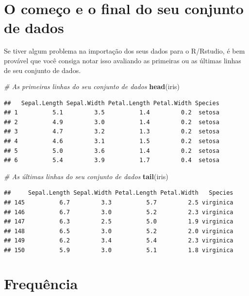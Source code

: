 \documentclass[
]{book}
\newenvironment{Shaded}{\begin{snugshade}}{\end{snugshade}}
\newcommand{\CommentTok}[1]{\textcolor[rgb]{0.56,0.35,0.01}{\textit{#1}}}
\newcommand{\KeywordTok}[1]{\textcolor[rgb]{0.13,0.29,0.53}{\textbf{#1}}}
\newcommand{\NormalTok}[1]{#1}
\begin{document}
\hypertarget{o-comeuxe7o-e-o-final-do-seu-conjunto-de-dados}{%
\section{O começo e o final do seu conjunto de
dados}\label{o-comeuxe7o-e-o-final-do-seu-conjunto-de-dados}}

Se tiver algum problema na importação dos seus dados para o R/Rstudio, é
bem provável que você consiga notar isso avaliando as primeiras ou as
últimas linhas de seu conjunto de dados.

\begin{Shaded}
\begin{Highlighting}[]
\CommentTok{# As primeiras linhas do seu conjunto de dados}
\KeywordTok{head}\NormalTok{(iris)}
\end{Highlighting}
\end{Shaded}

\begin{verbatim}
##   Sepal.Length Sepal.Width Petal.Length Petal.Width Species
## 1          5.1         3.5          1.4         0.2  setosa
## 2          4.9         3.0          1.4         0.2  setosa
## 3          4.7         3.2          1.3         0.2  setosa
## 4          4.6         3.1          1.5         0.2  setosa
## 5          5.0         3.6          1.4         0.2  setosa
## 6          5.4         3.9          1.7         0.4  setosa
\end{verbatim}

\begin{Shaded}
\begin{Highlighting}[]
\CommentTok{# As últimas linhas do seu conjunto de dados}
\KeywordTok{tail}\NormalTok{(iris)}
\end{Highlighting}
\end{Shaded}

\begin{verbatim}
##     Sepal.Length Sepal.Width Petal.Length Petal.Width   Species
## 145          6.7         3.3          5.7         2.5 virginica
## 146          6.7         3.0          5.2         2.3 virginica
## 147          6.3         2.5          5.0         1.9 virginica
## 148          6.5         3.0          5.2         2.0 virginica
## 149          6.2         3.4          5.4         2.3 virginica
## 150          5.9         3.0          5.1         1.8 virginica
\end{verbatim}

\hypertarget{frequuxeancia}{%
\section{Frequência}\label{frequuxeancia}}
\end{document}
